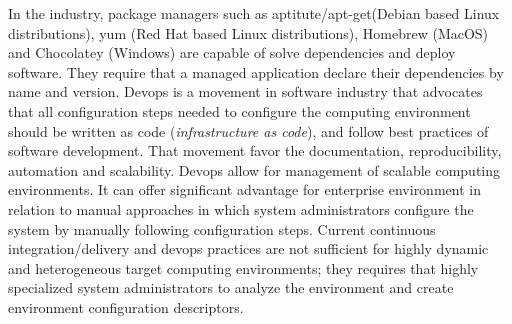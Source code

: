 In the industry, package managers such as aptitute/apt-get(Debian based Linux distributions), yum (Red Hat based Linux distributions), Homebrew (MacOS) and Chocolatey (Windows) are capable of solve dependencies and deploy software. They require that a managed application declare their dependencies by name and version. Devops\cite{bang_grounded_2013} is a movement in software industry that advocates that all configuration steps needed to configure the computing environment should be written as code (\emph{infrastructure as code}), and follow best practices of software development. That movement favor the documentation, reproducibility, automation and scalability.
Devops allow for management of scalable computing environments. It can offer significant advantage for enterprise environment in relation to manual approaches in which system administrators configure the system by manually following configuration steps. Current continuous integration/delivery and devops practices are not sufficient for highly dynamic and heterogeneous target computing environments; they requires that highly specialized system administrators to analyze the environment and create environment configuration descriptors.
